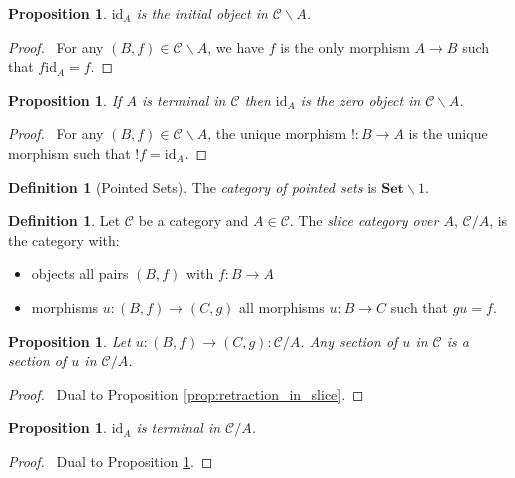\documentclass{book}
\let\qed\relax
\newtheorem{prop}[ax]{Proposition}
\theoremstyle{definition}
\newtheorem{df}[ax]{Definition}
\newcommand{\id}[1]{\ensuremath{\mathrm{id}_{#1}}}
\newcommand{\Set}{\ensuremath{\mathbf{Set}}}
\begin{document}
\begin{prop}
\label{prop:initial_in_slice}
$\id{A}$ is the initial object in $\mathcal{C} \backslash A$.
\end{prop}

\begin{proof}
\pf\ For any $(B,f) \in \mathcal{C} \backslash A$, we have $f$ is the only morphism $A \rightarrow B$ such that $f \id{A} = f$. \qed
\end{proof}

\begin{prop}
\label{prop:zero_in_slice}
If $A$ is terminal in $\mathcal{C}$ then $\id{A}$ is the zero object in $\mathcal{C} \backslash A$.
\end{prop}

\begin{proof}
\pf\ For any $(B,f) \in \mathcal{C} \backslash A$, the unique morphism $! : B \rightarrow A$ is the unique morphism such that $!f = \id{A}$. \qed
\end{proof}

\begin{df}[Pointed Sets]
The \emph{category of pointed sets} is $\Set \backslash 1$.
\end{df}

\begin{df}
Let $\mathcal{C}$ be a category and $A \in \mathcal{C}$. The \emph{slice category over $A$}, $\mathcal{C} / A$, is the category with:
\begin{itemize}
\item objects all pairs $(B,f)$ with $f : B \rightarrow A$
\item morphisms $u : (B,f) \rightarrow (C,g)$ all morphisms $u : B \rightarrow C$ such that $gu=f$.
\end{itemize}
\end{df}

\begin{prop}
Let $u : (B,f) \rightarrow (C,g) : \mathcal{C} / A$. Any section of $u$ in $\mathcal{C}$ is a section of $u$ in $\mathcal{C} / A$.
\end{prop}

\begin{proof}
\pf\ Dual to Proposition \ref{prop:retraction_in_slice}. \qed
\end{proof}

\begin{prop}
$\id{A}$ is terminal in $\mathcal{C} / A$.
\end{prop}

\begin{proof}
\pf\ Dual to Proposition \ref{prop:initial_in_slice}. \qed
\end{proof}
\end{document}
